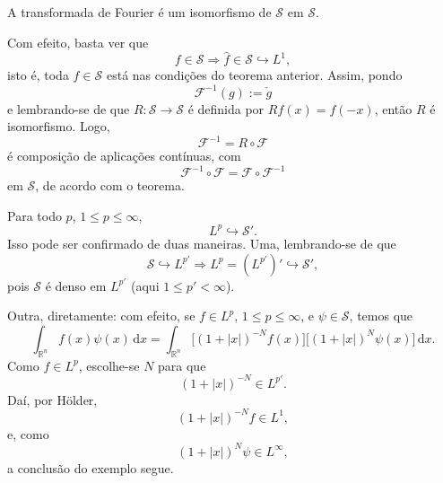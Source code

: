 \documentclass[../distribution_theory_notes.tex]{subfiles}
\begin{document}
\begin{crl*}
	A transformada de Fourier é um isomorfismo de \(\mathcal{S}\) em \(\mathcal{S}\).
\end{crl*}
\begin{proof*}
	Com efeito, basta ver que
	\[
		f\in \mathcal{S}\Longrightarrow \hat{f}\in \mathcal{S}\hookrightarrow L^{1},
	\]
	isto é, toda \(f\in \mathcal{S}\) está nas condições do teorema anterior. Assim, pondo
	\[
		\mathcal{F}^{-1}(g):=\check{g}
	\]
	e lembrando-se de que \(R:\mathcal{S}\to \mathcal{S}\) é definida por \(Rf(x)=f(-x)\), então \(R\) é isomorfismo. Logo,
	\[
		\mathcal{F}^{-1}=R\circ \mathcal{F}
	\]
	é composição de aplicações contínuas, com
	\[
		\mathcal{F}^{-1}\circ \mathcal{F}
		=\mathcal{F}\circ \mathcal{F}^{-1}
	\]
	em \(\mathcal{S}\), de acordo com o teorema. \qedsymbol
\end{proof*}

\begin{example}
	Para todo \(p\), \(1\leq p\leq \infty\),
	\[
		L^{p}\hookrightarrow \mathcal{S}'.
	\]
	Isso pode ser confirmado de duas maneiras. Uma, lembrando-se de que
	\[
		\mathcal{S}\hookrightarrow L^{p'}
		\Longrightarrow
		L^{p}=(L^{p'})'\hookrightarrow \mathcal{S}',
	\]
	pois \(\mathcal{S}\) é denso em \(L^{p'}\) (aqui \(1\leq p'<\infty\)).

	Outra, diretamente: com efeito, se \(f\in L^{p}\), \(1\leq p\leq \infty\), e \(\psi \in \mathcal{S}\), temos que
	\[
		\int_{\mathbb{R}^{n}}f(x)\psi (x)\,\mathrm{d}x
		=\int_{\mathbb{R}^{n}}
		\bigl[(1+|x|)^{-N}f(x)\bigr]
		\bigl[(1+|x|)^{N}\psi (x)\bigr] \,\mathrm{d}x.
	\]
	Como \(f\in L^{p}\), escolhe-se \(N\) para que
	\[
		(1+|x|)^{-N}\in L^{p'}.
	\]
	Daí, por Hölder,
	\[
		(1+|x|)^{-N}f\in L^{1},
	\]
	e, como
	\[
		(1+|x|)^{N}\psi \in L^{\infty},
	\]
	a conclusão do exemplo segue.
\end{example}
\end{document}

